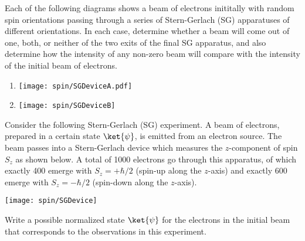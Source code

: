 \begin{problem}
  Each of the following diagrams shows a beam of electrons inititally with
  random spin orientations passing through a series of Stern-Gerlach (SG)
  apparatuses of different orientations.  In each case, determine whether
  a beam will come out of one, both, or neither of the two exits of the final
  SG apparatus, and also determine how the intensity of any non-zero beam 
  will compare with the intensity of the initial beam of electrons.

  \begin{enumerate}
  \item
    \texttt{[image: spin/SGDeviceA.pdf]}
  \item
    \texttt{[image: spin/SGDeviceB]}
  \end{enumerate}
\label{prob:SG1}
\end{problem}



\begin{problem}
Consider the following Stern-Gerlach (SG) experiment.
A beam of electrons, prepared in a certain state $\ket{\psi}$,
is emitted from an electron source. The beam passes into a Stern-Gerlach 
device which measures the $z$-component of spin $S_z$ as shown below. 
A total of 1000 electrons go through this apparatus, of which 
exactly 400 emerge with $S_z=+\hbar/2$ 
(spin-up along the $z$-axis) and exactly 600 emerge with 
$S_z=-\hbar/2$ (spin-down along the $z$-axis). 
\begin{center}
\texttt{[image: spin/SGDevice]}   
\end{center}

Write a possible normalized state $\ket{\psi}$ for the electrons in 
the initial beam that corresponds to the observations in this experiment.

%
%
%


\end{problem}
